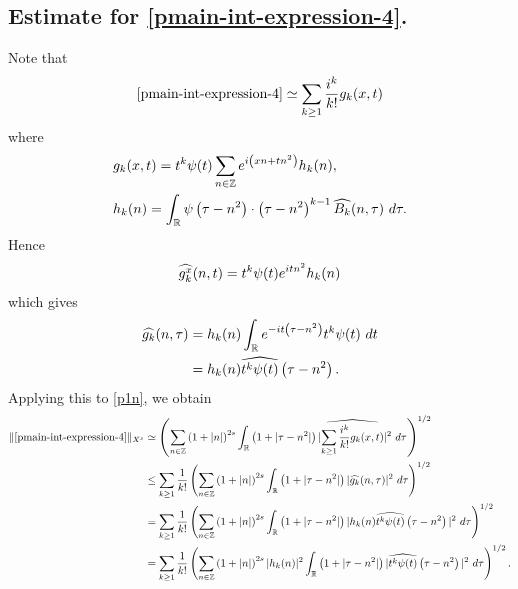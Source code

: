 \subsection{Estimate for \eqref{pmain-int-expression-4}.}
Note that
%
%
\begin{equation}
  \label{p1n}
  \begin{split}
    \eqref{pmain-int-expression-4} \simeq \sum_{k \ge 1}
    \frac{i^k}{k!}g_k(x,t)
  \end{split}
\end{equation}
%
%
where 
%
%
\begin{equation*}
  \begin{split}
    & g_k(x,t) = t^k \psi(t) \sum_{n \in \mathbb{Z}} e^{i\left( xn + tn^{2}
    \right)} h_k(n),
    \\
    & h_k(n) = \int_{\mathbb{R}} \psi \left( \tau - n^{2} \right) \cdot \left(
    \tau - n^{2} \right)^{k -1} \widehat{{B_k}}(n, \tau) \ d \tau.
  \end{split}
\end{equation*}
%
%
Hence
%
%
\begin{equation*}
  \begin{split}
    \widehat{g_k^x}(n, t) = t^{k} \psi(t) e^{i t n^{2}} h_k(n)
  \end{split}
\end{equation*}
%
%
which gives
%
%
\begin{equation*}
  \begin{split}
    \widehat{g_k}(n, \tau)
    & = h_k(n) \int_{\mathbb{R}} e^{-it\left( \tau - n^{2} \right)}
    t^{k}\psi(t) \ dt
    \\
    & = h_k(n) \widehat{t^{k}\psi(t)} \left( \tau - n^{2} \right).
  \end{split}
\end{equation*}
%
%
Applying this to \eqref{p1n}, we obtain
%
%
\begin{equation}
  \label{p2n}
  \begin{split}
    \|\eqref{pmain-int-expression-4}\|_{X^s} 
    & \simeq \left( \sum_{n \in \mathbb{Z}} \left (1 + |n| \right )^{2s} \int_{\mathbb{R}} \left( 1 + | \tau -
    n^{2}
    |
    \right) | \widehat{\sum_{k \ge 1} \frac{i^k}{k!}g_k(x,t)} |^2 \ d \tau
    \right)^{1/2}
    \\
    & \le \sum_{k \ge 1} \frac{1}{k!}\left( \sum_{n \in \mathbb{Z}} \left (1 + |n| \right )^{2s}
    \int_{\mathbb{R}} \left( 1 + | \tau - n^{2} | \right) | \widehat{g_k}(n, \tau) |^2 \
    d \tau \right)^{1/2}
    \\
    & = \sum_{k \ge 1} \frac{1}{k!} \left( \sum_{n \in \mathbb{Z}} \left (1 + |n| \right )^{2s}
    \int_{\mathbb{R}} \left( 1 + | \tau - n^{2} | \right) | h_k(n) \widehat{t^k
    \psi(t)} \left( \tau - n^{2} \right) |^2 \ d \tau \right)^{1/2}
    \\
    & = \sum_{k \ge 1} \frac{1}{k!} \left( \sum_{n \in \mathbb{Z}} \left (1 + |n| \right )^{2s} |
    h_k(n) |^2 \int_{\mathbb{R}} \left( 1 + | \tau - n^{2} | \right) | \widehat{t^k
    \psi(t)} \left( \tau - n^{2} \right) |^2 \ d \tau \right)^{1/2}.
  \end{split}
\end{equation}
